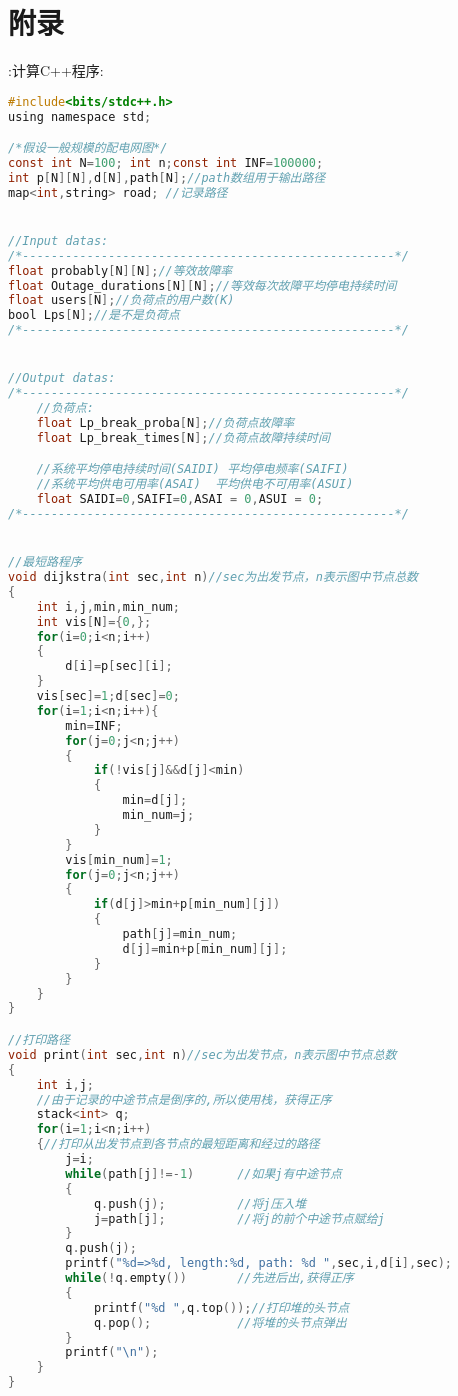 \documentclass[withoutpreface,bwprint]{cumcmthesis} %
\begin{document}
\section{附录}
\begin{appendices}
:计算C++程序:
\begin{lstlisting}[language=C]
#include<bits/stdc++.h>
using namespace std;

/*假设一般规模的配电网图*/
const int N=100; int n;const int INF=100000;
int p[N][N],d[N],path[N];//path数组用于输出路径
map<int,string> road; //记录路径


//Input datas: 
/*----------------------------------------------------*/
float probably[N][N];//等效故障率
float Outage_durations[N][N];//等效每次故障平均停电持续时间
float users[N];//负荷点的用户数(K)
bool Lps[N];//是不是负荷点
/*----------------------------------------------------*/


//Output datas:
/*----------------------------------------------------*/
    //负荷点:
    float Lp_break_proba[N];//负荷点故障率
    float Lp_break_times[N];//负荷点故障持续时间

    //系统平均停电持续时间(SAIDI) 平均停电频率(SAIFI)
    //系统平均供电可用率(ASAI)  平均供电不可用率(ASUI)
    float SAIDI=0,SAIFI=0,ASAI = 0,ASUI = 0;
/*----------------------------------------------------*/


//最短路程序
void dijkstra(int sec,int n)//sec为出发节点，n表示图中节点总数
{
    int i,j,min,min_num;
    int vis[N]={0,};
    for(i=0;i<n;i++)
    {
        d[i]=p[sec][i];
    }
    vis[sec]=1;d[sec]=0;
    for(i=1;i<n;i++){
        min=INF;
        for(j=0;j<n;j++)
        {
            if(!vis[j]&&d[j]<min)
            {
                min=d[j];
                min_num=j;
            }
        }
        vis[min_num]=1;
        for(j=0;j<n;j++)
        {
            if(d[j]>min+p[min_num][j])
            {
                path[j]=min_num;
                d[j]=min+p[min_num][j];
            }
        }
    }
}

//打印路径
void print(int sec,int n)//sec为出发节点，n表示图中节点总数
{
    int i,j;
    //由于记录的中途节点是倒序的,所以使用栈，获得正序
    stack<int> q; 
    for(i=1;i<n;i++)  
    {//打印从出发节点到各节点的最短距离和经过的路径
        j=i;
        while(path[j]!=-1)      //如果j有中途节点
        {
            q.push(j);          //将j压入堆
            j=path[j];          //将j的前个中途节点赋给j
        }
        q.push(j);
        printf("%d=>%d, length:%d, path: %d ",sec,i,d[i],sec);
        while(!q.empty())       //先进后出,获得正序
        {
            printf("%d ",q.top());//打印堆的头节点
            q.pop();            //将堆的头节点弹出
        }
        printf("\n");
    }
}


\end{lstlisting}
\end{appendices}
\end{document}
